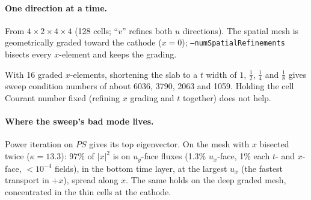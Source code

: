 \documentclass[11pt]{article}
\theoremstyle{remark}
\theoremstyle{definition}
\begin{document}
\paragraph{One direction at a time.}  From $4\times2\times4\times4$ (128 cells; ``$v$'' refines both $u$ directions).
The spatial mesh is geometrically graded toward the cathode ($x=0$); \texttt{--numSpatialRefinements} bisects every
$x$-element and keeps the grading.
\begin{center}
\end{center}
With 16 graded $x$-elements, shortening the slab to a $t$ width of $1$, $\tfrac12$, $\tfrac14$ and $\tfrac18$ gives
sweep condition numbers of about 6036, 3790, 2063 and 1059.  Holding the cell Courant number fixed (refining $x$ grading and $t$ together)
does not help.

\paragraph{Where the sweep's bad mode lives.}  Power iteration on $P S$ gives its top eigenvector.  On the mesh with
$x$ bisected twice ($\kappa=13.3$): 97\% of $|x|^2$ is on $u_y$-face fluxes (1.3\% $u_x$-face, 1\% each $t$- and
$x$-face, $<10^{-4}$ fields), in the bottom time layer, at the largest $u_x$ (the fastest transport in $+x$), spread
along $x$.  The same holds on the deep graded mesh, concentrated in the thin cells at the cathode.
\end{document}
